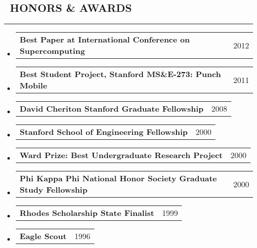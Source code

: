 \documentclass[10pt,letterpaper]{article}
\makeatletter
\newenvironment{resumesection}[1]
{%
    \subsection*{\ #1}
    \vspace{-0.4em}
    \hrule
    \vspace{+0.4em}
    \begin{itemize}
        \parskip=0.1em
}%
{%
    \end{itemize}
}%
\newcommand{\headerrowx}[2]
{\item[] \begin{tabular*}{\linewidth}{l@{\extracolsep{\fill}}r}
	#1 &
	#2 \\
\end{tabular*}}
\makeatother
\begin{document}
\begin{resumesection}{HONORS \& AWARDS}
    \headerrowx{ \textbf{Best Paper at International Conference on Supercomputing}}        {2012}
    \headerrowx{ \textbf{Best Student Project, Stanford MS\&E-273: Punch Mobile}}          {2011}
    \headerrowx{ \textbf{David Cheriton Stanford Graduate Fellowship}}                     {2008}
    \headerrowx{ \textbf{Stanford School of Engineering Fellowship}}                       {2000}
    \headerrowx{ \textbf{Ward Prize: Best Undergraduate Research Project}}                 {2000}
    \headerrowx{ \textbf{Phi Kappa Phi National Honor Society Graduate Study Fellowship}}  {2000}
    \headerrowx{ \textbf{Rhodes Scholarship State Finalist}}                               {1999}
    \headerrowx{ \textbf{Eagle Scout}}                                                     {1996}
\end{resumesection}
\end{document}

